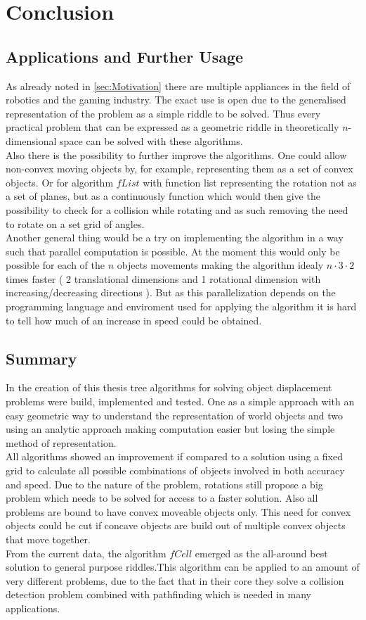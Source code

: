 \chapter{Conclusion}
\section{Applications and Further Usage}
As already noted in \ref{sec:Motivation} there are multiple appliances in the field of robotics and the gaming industry. The exact use is open due to the generalised representation of the problem as a simple riddle to be solved. Thus every practical problem that can be expressed as a geometric riddle in theoretically $n$-dimensional space can be solved with these algorithms.\\
Also there is the possibility to further improve the algorithms. One could allow non-convex moving objects by, for example, representing them as a set of convex objects. Or for algorithm $fList$ with function list representing the rotation not as a set of planes, but as a continuously function which would then give the possibility to check for a collision while rotating and as such removing the need to rotate on a set grid of angles.\\
Another general thing would be a try on implementing the algorithm in a way such that parallel computation is possible. At the moment this would only be possible for each of the $n$ objects movements making the algorithm idealy $n\cdot3\cdot2$ times faster ( 2 translational dimensions and 1 rotational dimension with increasing/decreasing directions ). But as this parallelization depends on the programming language and enviroment used for applying the algorithm it is hard to tell how much of an increase in speed could be obtained.
\section{Summary}
In the creation of this thesis tree algorithms for solving object displacement problems were build, implemented and tested. One as a simple approach with an easy geometric way to understand the representation of world objects and two using an analytic approach making computation easier but losing the simple method of representation. \\
All algorithms showed an improvement if compared to a solution using a fixed grid to calculate all possible combinations of objects involved in both accuracy and speed. Due to the nature of the problem, rotations still propose a big problem which needs to be solved for access to a faster solution. Also all problems are bound to have convex moveable objects only. This need for convex objects could be cut if concave objects are build out of multiple convex objects that move together.\\
From the current data, the algorithm $fCell$ emerged as the all-around best solution to general purpose riddles.This algorithm can be applied to an amount of very different problems, due to the fact that in their core they solve a collision detection problem combined with pathfinding which is needed in many applications.   